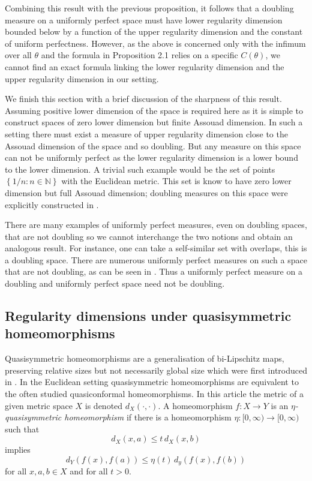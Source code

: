 Combining this result with the previous proposition, it follows that a doubling measure on a uniformly perfect space must have lower regularity dimension bounded below by a function of the upper regularity dimension and the constant of uniform perfectness. However, as the above is concerned only with the infimum over all $\theta$ and the formula in Proposition 2.1 relies on a specific $C(\theta)$, we cannot find an exact formula linking the lower regularity dimension and the upper regularity dimension in our setting.


We finish this section with a brief discussion of the sharpness of this result. Assuming positive lower dimension of the space is required here as it is simple to construct spaces of zero lower dimension but finite Assouad dimension. In such a setting there must exist a measure of upper regularity dimension close to the Assouad dimension of the space and so doubling. But any measure on this space can not be uniformly perfect as the lower regularity dimension is a lower bound to the lower dimension. A trivial such example would be the set of points $\left\{ 1/n : n \in \mathbb{N} \right\}$ with the Euclidean metric. This set is know to have zero lower dimension but full Assouad dimension; doubling measures on this space were explicitly constructed in \cite{fraser-howroyd}.

There are many examples of uniformly perfect measures, even on doubling spaces, that are not doubling so we cannot interchange the two notions and obtain an analogous result.  For instance, one can take a self-similar set with overlaps, this is a doubling space. There are numerous uniformly perfect measures on such a space that are not doubling, as can be seen in \cite{hare-trosch}. Thus a uniformly perfect measure on a doubling and uniformly perfect space need not be doubling.




\subsection{Regularity dimensions under quasisymmetric homeomorphisms}


Quasisymmetric homeomorphisms are a generalisation of bi-Lipschitz maps, preserving relative sizes but not necessarily global size which were first introduced in \cite{ahlfors-beurling,  tukia-vaisala}. In the Euclidean setting quasisymmetric homeomorphisms are equivalent to the often studied quasiconformal homeomorphisms. In this article the metric of a given metric space $X$ is denoted $d_X(\cdot,\cdot)$. A homeomorphism $f\colon X \rightarrow Y$ is an \textit{$\eta$-quasisymmetric homeomorphism} if there is a homeomorphism $\eta \colon [0,\infty) \rightarrow [0,\infty)$ such that 
\[
d_X( x , a ) \le t \, d_X( x , b )
\]
implies 
\[
d_Y( f(x) , f(a) ) \le \eta(t) \, d_y ( f(x) , f(b) )
\]
for all $x,a,b \in X$ and for all $t>0$.


